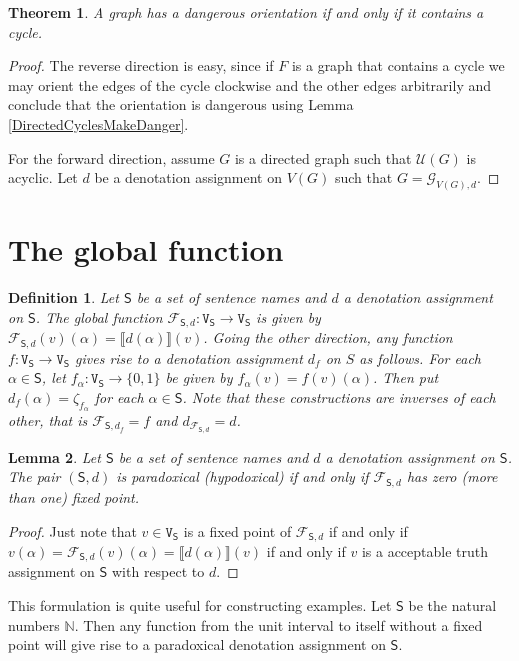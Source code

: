 \documentclass[12pt]{article}
\newtheorem{thm}{Theorem}
\newtheorem{lem}[thm]{Lemma}
\newtheorem{defn}{Definition}
\theoremstyle{remark}
\newcommand{\fancy}[1]{\mathcal{#1}}
\def\S{\textsf{S}}
\def\V{\texttt{V}}
\def\G{\fancy{G}}
\def\F{\fancy{F}}
\begin{document}
\begin{thm}
A graph has a dangerous orientation if and only if it contains a cycle.
\end{thm}
\begin{proof}
The reverse direction is easy, since if $F$ is a graph that contains a cycle we may orient the edges of the cycle clockwise and the other edges arbitrarily and conclude that the orientation is dangerous using Lemma \ref{DirectedCyclesMakeDanger}.\newline

For the forward direction, assume $G$ is a directed graph such that $\fancy{U}(G)$ is acyclic.  Let $d$ be a denotation assignment on $V(G)$ such that $G = \G_{V(G), d}$.
\end{proof}

\section{The global function}
\label{sec7}

\begin{defn}
Let $\S$ be a set of sentence names and $d$ a denotation assignment on $\S$. The \emph{global function} $\F_{\S, d} :\V_\S \rightarrow \V_\S$ is given by $\F_{\S, d}(v)(\alpha) = \llbracket d(\alpha) \rrbracket(v)$.  Going the other direction, any function $f: \V_\S \rightarrow \V_\S$ gives rise to a denotation assignment $d_f$ on $S$ as follows.  For each $\alpha \in \S$, let $f_{\alpha}: \V_\S \rightarrow \{0, 1\}$ be given by $f_{\alpha}(v) = f(v)(\alpha)$.  Then put $d_f(\alpha) = \zeta_{f_{\alpha}}$ for each $\alpha \in \S$.  Note that these constructions are inverses of each other, that is $\F_{\S, d_f} = f$ and $d_{\F_{\S, d}} = d$.
\end{defn}

\begin{lem}
Let $\S$ be a set of sentence names and $d$ a denotation assignment on $\S$.  The pair $(\S, d)$ is paradoxical (hypodoxical) if and only if $\F_{\S, d}$ has zero (more than one) fixed point.
\end{lem}
\begin{proof}
Just note that $v \in \V_\S$ is a fixed point of $\F_{\S, d}$ if and only if $v(\alpha) = \F_{\S, d}(v)(\alpha) = \llbracket d(\alpha) \rrbracket(v)$ if and only if $v$ is a acceptable truth assignment on $\S$ with respect to $d$.
\end{proof}

This formulation is quite useful for constructing examples.  Let $\S$ be the natural numbers $\mathbb{N}$.  Then any function from the unit interval to itself without a fixed point will give rise to a paradoxical denotation assignment on $\S$.\newline
\end{document}
